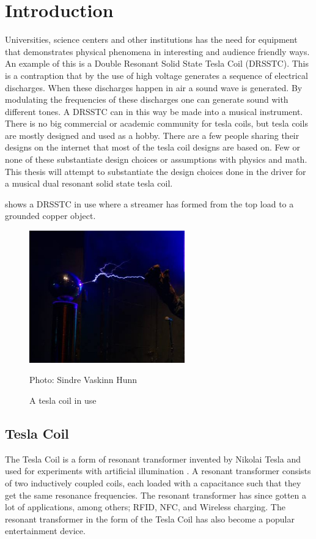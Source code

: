 \chapter{Introduction}
\label{intro}
Universities, science centers and other institutions has the need for equipment that demonstrates physical phenomena in interesting and audience friendly ways. An example of this is a Double Resonant Solid State Tesla Coil (DRSSTC). This is a contraption that by the use of high voltage generates a sequence of electrical discharges. When these discharges happen in air a sound wave is generated. By modulating the frequencies of these discharges one can generate sound with different tones. A DRSSTC can in this way be made into a musical instrument.
There is no big commercial or academic community for tesla coils, but tesla coils are mostly designed and used as a hobby. There are a few people sharing their designs on the internet that most of the tesla coil designs are based on. Few or none of these substantiate design choices or assumptions with physics and math. This thesis will attempt to substantiate the design choices done in the driver for a musical dual resonant solid state tesla coil.

 shows a DRSSTC in use where a streamer has formed from the top load to a grounded copper object.

\begin{figure}[ht]
    \centering
    \includegraphics[width=0.6\textwidth]{img/teslabano.jpg}
    \caption{A tesla coil in use}
    Photo: Sindre Vaskinn Hunn
    \label{fig:teslabano}
\end{figure}

\section{Tesla Coil}
\label{tesla}
The Tesla Coil is a form of resonant transformer invented by Nikolai Tesla and used for experiments with artificial illumination \citep{5570149}. A resonant transformer consists of two inductively coupled coils, each loaded with a capacitance such that they get the same resonance frequencies. The resonant transformer has since gotten a lot of applications, among others; RFID, NFC, and Wireless charging. The resonant transformer in the form of the Tesla Coil has also become a popular entertainment device.

